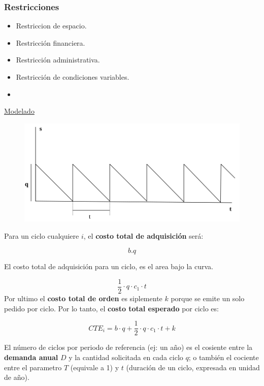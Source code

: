 \documentclass{article}
\begin{document}
\subsubsection{Restricciones}

\begin{itemize}
    \item Restriccion de espacio.
    \item Restricción financiera.
    \item Restricción administrativa.
    \item Restricción de condiciones variables.
    \item 
\end{itemize}

\underline{Modelado}

\begin{figure}[h!]
    \includegraphics[width=\linewidth]{imagenes/stock-modelo-basico.png}
\end{figure}

Para un ciclo cualquiere \(i\), el \textbf{costo total de adquisición} será:

\[
    b.q
\]

El costo total de adquisición para un ciclo, es el area bajo la curva.

\[
    \frac{1}{2} \cdot q \cdot c_1 \cdot t
\]
Por ultimo el \textbf{costo total de orden} es siplemente \(k\) porque se emite un solo pedido por ciclo. 
Por lo tanto, el \textbf{costo total esperado} por ciclo es:

\begin{equation}
    CTE_i= b \cdot q+\frac{1}{2} \cdot q \cdot c_1 \cdot t + k
\end{equation}

El número de ciclos por periodo de referencia (ej: un año) es el cosiente entre la \textbf{demanda anual} \(D\) 
y la cantidad solicitada en cada ciclo \(q\); o también el cociente entre el parametro \(T\) (equivale a 1) y \(t\)
(duración de un ciclo, expresada en unidad de año).
\end{document}
